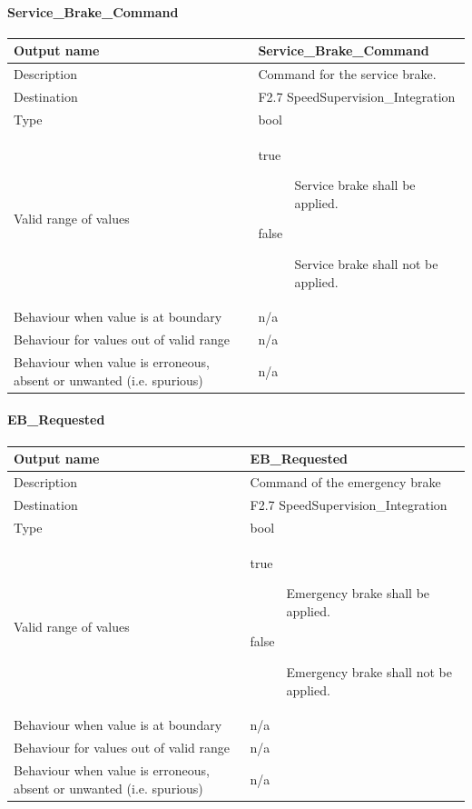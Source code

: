 \paragraph{Service\_Brake\_Command}

\begin{longtable}{p{}p{}}
\toprule
Output name				& Service\_Brake\_Command \\
\midrule
Description				& Command for the service brake. \\
\midrule
Destination				& F2.7 SpeedSupervision\_Integration \\ 
\midrule
Type					& bool \\
\midrule
Valid range of values	&  
\begin{description}
\item[true] Service brake shall be applied.
\item[false] Service brake shall not be applied.
\end{description}\\
\midrule
Behaviour when value is at boundary	& n/a \\ 
\midrule
Behaviour for values out of valid range	& n/a \\ 
\midrule
Behaviour when value is erroneous, absent or unwanted (i.e. spurious) & n/a \\
\bottomrule
\end{longtable}

\paragraph{EB\_Requested}

\begin{longtable}{p{}p{}}
\toprule
Output name				& EB\_Requested \\
\midrule
Description				& Command of the emergency brake \\
\midrule
Destination				& F2.7 SpeedSupervision\_Integration \\ 
\midrule
Type					& bool \\
\midrule
Valid range of values	&  
\begin{description}
\item[true] Emergency brake shall be applied.
\item[false] Emergency brake shall not be applied.
\end{description}\\
\midrule
Behaviour when value is at boundary	& n/a \\ 
\midrule
Behaviour for values out of valid range	& n/a \\ 
\midrule
Behaviour when value is erroneous, absent or unwanted (i.e. spurious) & n/a \\
\bottomrule
\end{longtable}



